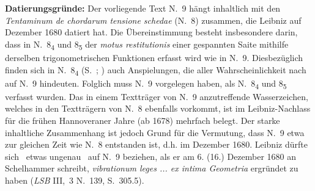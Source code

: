 \begin{ledgroup}
\footnotesize
\pstart
\noindent%
\textbf{Datierungsgründe:}
Der vorliegende Text N.~9 hängt inhaltlich mit den \textit{Tentaminum de chordarum tensione schedae} (N.~8) zusammen, die Leibniz auf Dezember 1680 datiert hat.
Die Über\-ein\-stim\-mung besteht insbesondere darin, dass in N.~8\textsubscript{4} und 8\textsubscript{5} der \textit{motus restitutionis} einer gespannten Saite mit\-hilfe derselben trigonometrischen Funktionen erfasst wird wie in N.~9.
Dies\-be\-züg\-lich finden sich in N.~8\textsubscript{4} (S.~; ) auch Anspielungen, die aller Wahr\-schein\-lich\-keit nach auf N.~9 hindeuten.
Folglich muss N.~9 vorgelegen haben, als N.~8\textsubscript{4} und 8\textsubscript{5} verfasst wurden.
Das in einem Textträger von N.~9 anzutreffende Wasserzeichen, welches in den Textträgern von N.~8 ebenfalls vorkommt, ist im Leibniz-Nachlass für die frühen Hannoveraner Jahre (ab 1678) mehrfach belegt.
Der starke inhalt\-li\-che Zusammenhang %
ist jedoch Grund für die Vermutung, dass N.~9 etwa zur gleichen Zeit wie N.~8 entstanden ist, d.h. im Dezember 1680.
Leibniz dürfte sich \textendash\ etwas ungenau \textendash\ auf N.~9 beziehen, als er am 6. (16.) Dezember 1680 an Schelhammer schreibt, \textit{vibrationum leges ... ex intima Geometria} ergründet zu haben (\textit{LSB} III,~3 N.~139, S.~305.5\cite{01275}).

\pend
\end{ledgroup}
